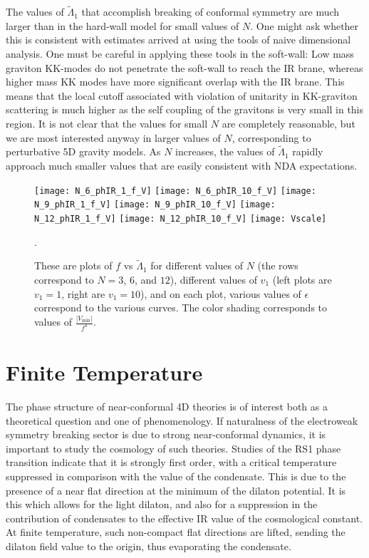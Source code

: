 \documentclass[12pt]{article}
\renewcommand{\tilde}{\widetilde} %
\begin{document}
The values of $\tilde{\Lambda}_1$ that accomplish breaking of conformal symmetry are much larger than in the hard-wall model for small values of $N$.  One might ask whether this is consistent with estimates arrived at using the tools of naive dimensional analysis.  One must be careful in applying these tools in the soft-wall:  Low mass graviton KK-modes do not penetrate the soft-wall to reach the IR brane, whereas higher mass KK modes have more significant overlap with the IR brane.  This means that the local cutoff associated with violation of unitarity in KK-graviton scattering is much higher as the self coupling of the gravitons is very small in this region.  It is not clear that the values for small $N$ are completely reasonable, but we are most interested anyway in larger values of $N$, corresponding to perturbative 5D gravity models.  As $N$ increases, the values of $\tilde{\Lambda}_1$ rapidly approach much smaller values that are easily consistent with NDA expectations.
\begin{figure}[!htbp]
	\center
\texttt{[image: N\_6\_phIR\_1\_f\_V]}
\texttt{[image: N\_6\_phIR\_10\_f\_V]}
\texttt{[image: N\_9\_phIR\_1\_f\_V]}
\texttt{[image: N\_9\_phIR\_10\_f\_V]}
\texttt{[image: N\_12\_phIR\_1\_f\_V]}
\texttt{[image: N\_12\_phIR\_10\_f\_V]}
\texttt{[image: Vscale]}
\caption{These are plots of $f$ vs $\tilde{\Lambda}_1$ for different values of $N$ (the rows correspond to $N=3$, $6$, and $12$), different values of $v_1$ (left plots are $v_1 = 1$, right are $v_1 = 10$), and on each plot, various values of $\epsilon$ correspond to the various curves.  The color shading corresponds to values of $\frac{|V_\text{min}|}{f^4}$.}.
\label{fig:fvsLambda1}
\end{figure}

\section{Finite Temperature}
\label{sec:finiteT}


The phase structure of near-conformal 4D theories is of interest both as a theoretical question and one of phenomenology.  If naturalness of the electroweak symmetry breaking sector is due to strong near-conformal dynamics, it is important to study the cosmology of such theories.   Studies of the RS1 phase transition indicate that it is strongly first order, with a critical temperature suppressed in comparison with the value of the condensate.  This is due to the presence of a near flat direction at the minimum of the dilaton potential.  It is this which allows for the light dilaton, and also for a suppression in the contribution of condensates to the effective IR value of the cosmological constant.  At finite temperature, such non-compact flat directions are lifted, sending the dilaton field value to the origin, thus evaporating the condensate.
\end{document}
